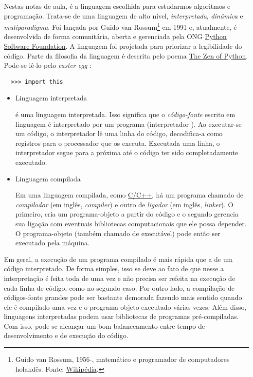 Nestas notas de aula, {\python} é a linguagem escolhida para estudarmos algoritmos e programação. Trata-se de uma linguagem de alto nível, \emph{interpretada}, \emph{dinâmica} e \emph{mutiparadigma}. Foi lançada por Guido van Rossum\footnote{Guido van Rossum, 1956-, matemático e programador de computadores holandês. Fonte: \href{https://pt.wikipedia.org/wiki/Guido\_van\_Rossum}{Wikipédia}.} em 1991 e, atualmente, é desenvolvida de forma comunitária, aberta e gerenciada pela ONG \href{https://pt.wikipedia.org/wiki/Python_Software_Foundation}{Python Software Foundation}. A linguagem foi projetada para priorizar a legibilidade do código. Parte da filosofia da linguagem é descrita pelo poema \href{https://pt.wikipedia.org/wiki/Zen_de_Python}{The Zen of Python}. Pode-se lê-lo pelo {\it easter egg} {\python}:
\begin{lstlisting}
  >>> import this
\end{lstlisting}

\begin{itemize}
\item Linguagem interpretada

  {\python} é uma linguagem interpretada. Isso significa que o \emph{código-fonte} escrito em linguagem {\python} é interpretado por um programa (interpretador {\python}). Ao executar-se um código, o interpretador lê uma linha do código, decodifica-a como registros para o processador que os executa. Executada uma linha, o interpretador segue para a próxima até o código ter sido completadamente executado.

\item Linguagem compilada

  Em uma linguagem compilada, como \href{https://pt.wikipedia.org/wiki/C\%2B\%2B}{C/C++}, há um programa chamado de \emph{compilador} (em inglês, {\it compiler}) e outro de \emph{ligador} (em inglês, {\it linker}). O primeiro, cria um programa-objeto a partir do código e o segundo gerencia sua ligação com eventuais bibliotecas computacionais que ele possa depender. O programa-objeto (também chamado de executável) pode então ser executado pela máquina.
\end{itemize}

Em geral, a execução de um programa compilado é mais rápida que a de um código interpretado. De forma simples, isso se deve ao fato de que nesse a interpretação é feita toda de uma vez e não precisa ser refeita na execução de cada linha de código, como no segundo caso. Por outro lado, a compilação de códigos-fonte grandes pode ser bastante demorada fazendo mais sentido quando ele é compilado uma vez e o programa-objeto executado várias vezes. Além disso, linguagens interpretadas podem usar bibliotecas de programas pré-compiladas. Com isso, pode-se alcançar um bom balanceamento entre tempo de desenvolvimento e de execução do código.

